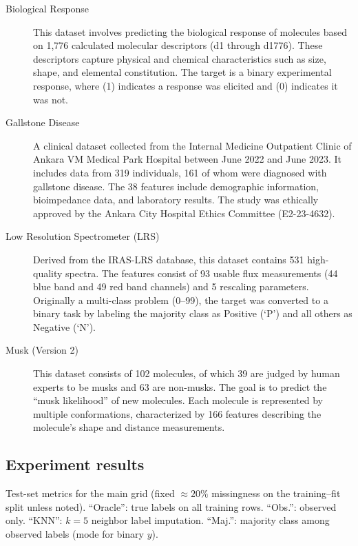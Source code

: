 \documentclass{article}
\begin{document}
\begin{description}
    \item[Biological Response \cite{dataset_bioresponse}] 
        This dataset involves predicting the biological response of molecules based on 1,776 calculated molecular descriptors (d1 through d1776). These descriptors capture physical and chemical characteristics such as size, shape, and elemental constitution. The target is a binary experimental response, where (1) indicates a response was elicited and (0) indicates it was not.
    \item[Gallstone Disease \cite{dataset_gallstone}] 
    A clinical dataset collected from the Internal Medicine Outpatient Clinic of Ankara VM Medical Park Hospital between June 2022 and June 2023. It includes data from 319 individuals, 161 of whom were diagnosed with gallstone disease. The 38 features include demographic information, bioimpedance data, and laboratory results. The study was ethically approved by the Ankara City Hospital Ethics Committee (E2-23-4632).

    \item[Low Resolution Spectrometer (LRS) \cite{dataset_spectrometer}] 
    Derived from the IRAS-LRS database, this dataset contains 531 high-quality spectra. The features consist of 93 usable flux measurements (44 blue band and 49 red band channels) and 5 rescaling parameters. Originally a multi-class problem (0--99), the target was converted to a binary task by labeling the majority class as Positive (`P') and all others as Negative (`N').
    
    \item[Musk (Version 2) \cite{dataset_musk2}] 
    This dataset consists of 102 molecules, of which 39 are judged by human experts to be musks and 63 are non-musks. The goal is to predict the ``musk likelihood'' of new molecules. Each molecule is represented by multiple conformations, characterized by 166 features describing the molecule's shape and distance measurements.
\end{description}

\subsection{Experiment results}
\label{app:task3}

Test-set metrics for the main grid (fixed $\approx 20\%$ missingness on the training--fit split unless noted). ``Oracle'': true labels on all training rows. ``Obs.'': observed only. ``KNN'': $k{=}5$ neighbor label imputation. ``Maj.'': majority class among observed labels (mode for binary $y$).
\end{document}
